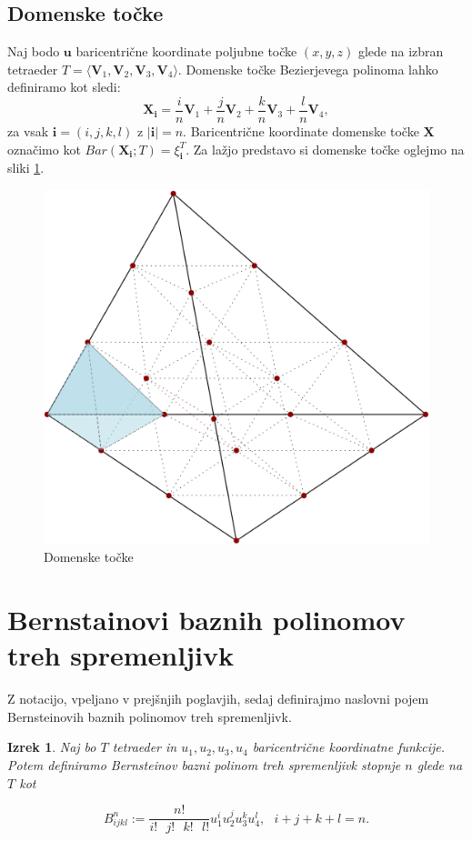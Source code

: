 \documentclass[a4paper, 12pt]{article}
\theoremstyle{definition} %
\theoremstyle{plain} %
\newtheorem{theorem}{Izrek}[section]
\begin{document}
\subsection{Domenske točke}
Naj bodo $\textbf{u}$ baricentrične koordinate poljubne točke $(x, y, z)$ glede na izbran tetraeder $T = \langle\textbf{V}_{1}, \textbf{V}_{2}, \textbf{V}_{3}, \textbf{V}_{4}\rangle$. 
Domenske točke Bezierjevega polinoma lahko definiramo kot sledi:
$$
\textbf{X}_{\textbf{i}} = \frac{i}{n}\textbf{V}_{1} + \frac{j}{n}\textbf{V}_{2} + \frac{k}{n}\textbf{V}_{3} + \frac{l}{n}\textbf{V}_{4},
$$
za vsak $\textbf{i} = (i, j, k, l)$ z $|\textbf{i}| = n$.
Baricentrične koordinate domenske točke $\textbf{X}$ 
označimo kot $Bar(\textbf{X}_{\textbf{i}}; T) = \xi^{T}_{\textbf{i}}$.
Za lažjo predstavo si domenske točke oglejmo na sliki \ref{fig:domenske}.

\begin{figure}[h!]
\centering
  \includegraphics[scale=0.4]{domen}
  \caption{Domenske točke}
  \label{fig:domenske}
\end{figure}

\section{Bernstainovi baznih polinomov treh spremenljivk}
Z notacijo, vpeljano v prejšnjih poglavjih, sedaj definirajmo naslovni 
pojem Bernsteinovih baznih polinomov treh spremenljivk.
\begin{theorem}
  Naj bo $T$ tetraeder in $u_1,u_2,u_3,u_4$
  baricentrične koordinatne funkcije.
  Potem definiramo Bernsteinov bazni polinom treh spremenljivk 
  stopnje $n$ glede na $T$ kot 

  $$
  B_{ijkl}^n := \frac{n!}{i!\text{ }j!\text{ }k!\text{ }l!}u_1^iu_2^ju_3^ku_4^l,\text{    }i+j+k+l=n.
  $$
\end{theorem}
\end{document}
